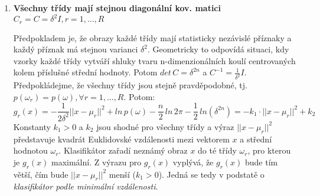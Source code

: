 \begin{enumerate}
\item \textbf{Všechny třídy mají stejnou diagonální kov. matici $ C_r = C = \delta^2 I, r=1,...,R $}

Předpokladem je, že obrazy každé třídy mají statisticky nezávislé příznaky a každý příznak má stejnou varianci $ \delta^2 $. Geometricky to odpovídá situaci, kdy vzorky každé třídy vytváří shluky tvaru n-dimenzionálních koulí centrovaných kolem příslušné střední hodnoty. Potom $ det \, C = \delta^{2n} $ a $ C^{-1} = \frac{1}{\delta^2} I $. Předpokládejme, že všechny třídy jsou stejně pravděpodobné, tj. $ p(\omega_r) = p(\omega), \forall r=1,...,R $. Potom:
\begin{equation}
g_r(x) = - \frac{1}{2\delta^2} || x-\mu_r ||^2 + ln \, p(\omega) -\frac{n}{2} \, ln \, 2\pi - \frac{1}{2} \, ln(\delta^{2n}) = -k_1 \cdot || x-\mu_r ||^2 + k_2
\end{equation}
Konstanty $ k_1 > 0 $ a $ k_2 $ jsou shodné pro všechny třídy a výraz $ || x-\mu_r ||^2 $ představuje kvadrát Euklidovské vzdálenosti mezi vektorem $ x $ a střední hodnotou $ \omega_r $. Klasifikátor zařadí neznámý obraz $ x $ do té třídy $ \omega_r $, pro kterou je $ g_r(x) $ maximální. Z výrazu pro $ g_r(x) $ vyplývá, že  $ g_r(x) $ bude tím větší, čím bude $ || x-\mu_r ||^2 $ menší ($ k_1 > 0 $). Jedná se tedy v podstatě o \textit{klasifikátor podle minimální vzdálenosti}.
\end{enumerate}

